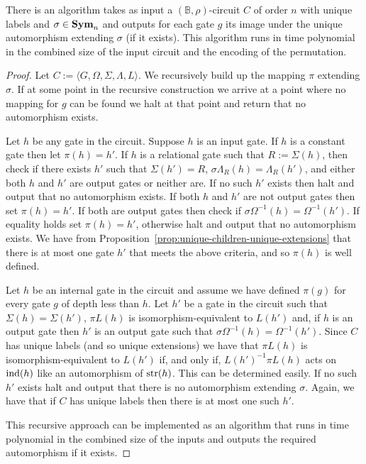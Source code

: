\documentclass[../paper.tex]{subfiles}
\begin{document}
\begin{lem}
  There is an algorithm takes as input a $(\mathbb{B}, \rho)$-circuit $C$ of
  order $n$ with unique labels and $\sigma \in \text{\textbf{Sym}}_n$ and outputs for each gate
  $g$ its image under the unique automorphism extending $\sigma$ (if it exists).
  This algorithm runs in time polynomial in the combined size of the input
  circuit and the encoding of the permutation.
  \label{lem:compute-automorphisms}
\end{lem}
\begin{proof}
  Let $C := \langle G, \Omega, \Sigma, \Lambda, L \rangle$. We recursively build
  up the mapping $\pi$ extending $\sigma$. If at some point in the recursive
  construction we arrive at a point where no mapping for $g$ can be found we
  halt at that point and return that no automorphism exists.

  Let $h$ be any gate in the circuit. Suppose $h$ is an input gate. If $h$ is a
  constant gate then let $\pi (h) = h'$. If $h$ is a relational gate such that
  $R := \Sigma(h)$, then check if there exists $h'$ such that $\Sigma (h') = R$,
  $\sigma \Lambda_R(h) = \Lambda_R(h')$, and either both $h$ and $h'$ are output
  gates or neither are. If no such $h'$ exists then halt and output that no
  automorphism exists. If both $h$ and $h'$ are not output gates then set $\pi
  (h) = h'$. If both are output gates then check if $\sigma \Omega^{-1}(h) =
  \Omega^{-1}(h')$. If equality holds set $\pi(h) = h'$, otherwise halt and
  output that no automorphism exists. We have from
  Proposition~\ref{prop:unique-children-unique-extensions} that there is at
  most one gate $h'$ that meets the above criteria, and so $\pi(h)$ is well
  defined.

  Let $h$ be an internal gate in the circuit and assume we have defined $\pi
  (g)$ for every gate $g$ of depth less than $h$. Let $h'$ be a gate in the
  circuit such that $\Sigma(h) = \Sigma (h')$, $\pi L(h)$ is
  isomorphism-equivalent to $L(h')$ and, if $h$ is an output gate then $h'$ is
  an output gate such that $\sigma \Omega^{-1}(h) = \Omega^{-1}(h')$. Since $C$
  has unique labels (and so unique extensions) we have that $\pi L(h)$ is
  isomorphism-equivalent to $L(h')$ if, and only if, $L(h')^{-1}\pi L(h)$ acts
  on $\text{\upshape ind}(h)$ like an automorphism of $\text{str}(h)$. This can be determined easily.
  If no such $h'$ exists halt and output that there is no automorphism extending
  $\sigma$. Again, we have that if $C$ has unique labels then there is at most
  one such $h'$.

  This recursive approach can be implemented as an algorithm that runs in time
  polynomial in the combined size of the inputs and outputs the required
  automorphism if it exists.
\end{proof}
\end{document}

